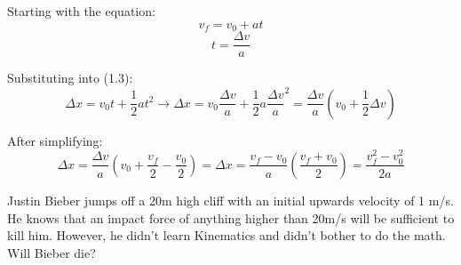 \begin{solution}
Starting with the equation:
\begin{equation*} v_f = v_0 + at\end{equation*}
\begin{equation*} t=\frac{\Delta v}{a} \end{equation*}

Substituting into (1.3):
\begin{equation*}
    \Delta x = v_0 t + \frac{1}{2}at^2 \rightarrow
    \Delta x = v_0 \frac{\Delta v}{a} + \frac{1}{2}a\frac{\Delta v}{a}^2 =
    \frac{\Delta v}{a}(v_0  + \frac{1}{2}\Delta v)
\end{equation*}

After simplifying:
\begin{equation*}
    \Delta x = \frac{\Delta v}{a}(v_0  + \frac{v_f}{2} - \frac{v_0}{2}) =
    \Delta x = \frac{v_f-v_0}{a}(\frac{v_f+v_0}{2}) = \frac{v_f^2-v_0^2}{2a}

\end{equation*}


\end{solution}


\begin{question}
Justin Bieber jumps off a 20m high cliff with an initial upwards velocity of 1 m/s. He knows that an impact force of anything higher than 20m/s will be sufficient to kill him. However, he didn't learn Kinematics and didn't bother to do the math. Will Bieber die?
\end{question}

